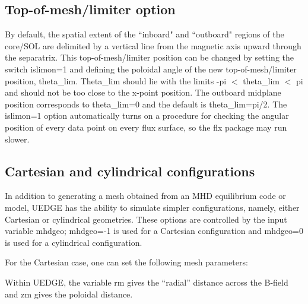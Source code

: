 \documentclass [12pt]{article}
\def\hsa{\hskip.4truein}
\begin{document}
\subsection{Top-of-mesh/limiter option}

By default, the spatial extent of the ``inboard" and ``outboard" regions
of the core/SOL are delimited by a vertical line from the magnetic
axis upward through the separatrix.  This top-of-mesh/limiter position
can be changed by setting the switch islimon=1 and defining the
poloidal angle of the new top-of-mesh/limiter position, theta\_lim.
Theta\_lim should lie with the limits -pi $<$ theta\_lim $<$ pi and should
not be too close to the x-point position.  The outboard midplane
position corresponds to theta\_lim=0 and the default is theta\_lim=pi/2.
The islimon=1 option automatically turns on a procedure for checking
the angular position of every data point on every flux surface, so the
flx package may run slower.

\subsection{Cartesian and cylindrical configurations}

In addition to generating a mesh obtained from an MHD equilibrium code or
model, {\sf UEDGE} has the ability to simulate simpler configurations, namely,
either Cartesian or cylindrical geometries.  These options are controlled by
the input variable {\sf mhdgeo}; {\sf mhdgeo=-1} is used for a Cartesian
configuration and {\sf mhdgeo=0} is used for a cylindrical configuration.

For the Cartesian case, one can set the following mesh parameters:
{\sf
{} 
} \noindent Within {\sf UEDGE}, the variable {\sf rm} gives the ``radial''
distance across the B-field and {\sf zm} gives the poloidal distance.
\end{document}
